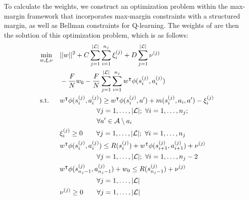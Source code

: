 To calculate the weights, we construct an optimization problem within the
max-margin framework that incorporates max-margin constraints with a structured
margin, as well as Bellman constraints for Q-learning. The weights of \approxq{}
are then the solution of this optimization problem, which is as follows:
\begin{align}
& \underset{w, \xi, \nu}{\text{min}}  & & ||\weights{}||^2 + \marginslackc{} \sum_{j=1}^{\labelsetsize{}} \sum_{i=1}^{\nsub{j}} \marginslacksubsup{i}{(j)}
                                                      + \bellmanslackc{} \sum_{j=1}^{\labelsetsize{}} \bellmanslacksup{(j)} \notag \\
&    & & - \frac{\bellmanc{}}{\labelsatotal{}} \weightszero{} - \frac{\bellmanc{}}{\labelsatotal{}} \sum_{j=1}^{\labelsetsize{}} \sum_{i=1}^{\nsub{j}} \weightst{}\features{\statesubsup{i}{(j)}}{\actionsubsup{i}{(j)}}\\
& \text{s.t.} & &\weightst{} \features{\statesubsup{i}{(j)}}{\actionsubsup{i}{(j)}} \geq \weightst{} \phi(\statesubsup{i}{(j)}, \actionvar{}') + \marginvar{}(\statesubsup{i}{(j)}, \actionsub{i}, \actionvar{}') - \marginslacksubsup{i}{(j)} \notag\\
    &&&\hspace{1.9cm}\forall j = 1, \ldots, \labelsetsize{}; \text{ } \forall i = 1, \ldots, \nsub{j}; \notag\\
    &&&\hspace{1.9cm}\forall \actionvar{}' \in \actionset{}\setminus \actionvar{}_i  \label{eq:margin_constr}\\
&    & & \marginslacksubsup{i}{(j)} \geq 0 \hspace{0.7cm} \forall j = 1, \ldots, \labelsetsize{}; \text{ } \forall i = 1, \ldots, \nsub{j} \label{eq:margin_slacks}\\
&    & & \weightst{}\features{\statesubsup{i}{(j)}}{\actionsubsup{i}{(j)}} \leq \rewardfn{}(\statesubsup{i}{(j)}) + \weightst{}\features{\statesubsup{i+1}{(j)}}{\actionsubsup{i+1}{(j)}} + \bellmanslacksup{(j)} \notag \\
    &&&\hspace{1.9cm} \forall j = 1, \ldots, \labelsetsize{}; \text{ } \forall i = 1, \ldots, \nsub{j} - 2 \label{eq:bellman_constr}\\
&    & & \weightst{}\features{\statesubsup{\nsub{j}-1}{(j)}}{\actionsubsup{\nsub{j}-1}{(j)}} + \weightszero \leq \rewardfn{}(\statesubsup{\nsub{j}-1}{(j)}) + \bellmanslacksup{(j)} \notag \\
    &&&\hspace{1.9cm} \forall j = 1, \ldots, \labelsetsize{} \label{eq:bellman_goal_constr}\\
&    & & \bellmanslacksup{(j)} \geq 0 \hspace{0.7cm} \forall j = 1, \ldots, \labelsetsize{} \label{eq:bellman_slack}
\end{align}

